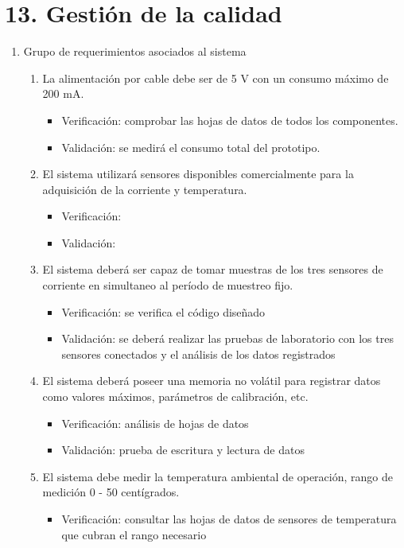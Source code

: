 \documentclass[11pt]{charter}
\begin{document}
\section{13. Gestión de la calidad}
\label{sec:calidad}


\begin{enumerate}
\item Grupo de requerimientos asociados al sistema
	\begin{enumerate}
	\item La alimentación por cable debe ser de 5 V con un consumo máximo de 200 mA. \label{req1}
		\begin{itemize}
			\item Verificación: comprobar las hojas de datos de todos los componentes.  
			\item Validación: se medirá el consumo total del prototipo.  
		\end{itemize}
	\item El sistema utilizará sensores disponibles comercialmente para la adquisición de la corriente y temperatura.
		\begin{itemize}
			\item Verificación: 
			\item Validación: 
		\end{itemize}
	\item El sistema deberá ser capaz de tomar muestras de los tres sensores de corriente en simultaneo al período de muestreo fijo.
		\begin{itemize}
			\item Verificación: se verifica el código diseñado 
			\item Validación: se deberá realizar las pruebas de laboratorio con los tres sensores conectados y el análisis de los datos registrados
		\end{itemize}
	\item El sistema deberá poseer una memoria no volátil para registrar datos como valores máximos, parámetros de calibración, etc. 
		\begin{itemize}
			\item Verificación: análisis de hojas de datos
			\item Validación: prueba de escritura y lectura de datos
		\end{itemize}
	\item El sistema debe medir la temperatura ambiental de operación, rango de medición 0 - 50 centígrados.
		\begin{itemize}
			\item Verificación: consultar las hojas de datos de sensores de temperatura que cubran el rango necesario

\end{itemize}
\end{enumerate}
\end{enumerate}
\end{document}
